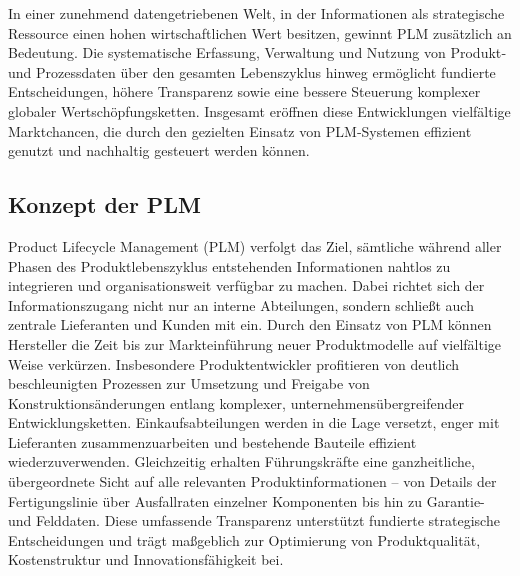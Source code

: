
In einer zunehmend datengetriebenen Welt, in der Informationen als strategische Ressource einen hohen wirtschaftlichen Wert besitzen, gewinnt PLM zusätzlich an Bedeutung. Die systematische Erfassung, Verwaltung und Nutzung von Produkt‑ und Prozessdaten über den gesamten Lebenszyklus hinweg ermöglicht fundierte Entscheidungen, höhere Transparenz sowie eine bessere Steuerung komplexer globaler Wertschöpfungsketten.
Insgesamt eröffnen diese Entwicklungen vielfältige Marktchancen, die durch den gezielten Einsatz von PLM‑Systemen effizient genutzt und nachhaltig gesteuert werden können. \cite{grieves2005product}
\subsection{Konzept der PLM}
Product Lifecycle Management (PLM) verfolgt das Ziel, sämtliche während aller Phasen des Produktlebenszyklus entstehenden Informationen nahtlos zu integrieren und organisationsweit verfügbar zu machen. Dabei richtet sich der Informationszugang nicht nur an interne Abteilungen, sondern schließt auch zentrale Lieferanten und Kunden mit ein.
Durch den Einsatz von PLM können Hersteller die Zeit bis zur Markteinführung neuer Produktmodelle auf vielfältige Weise verkürzen. Insbesondere Produktentwickler profitieren von deutlich beschleunigten Prozessen zur Umsetzung und Freigabe von Konstruktionsänderungen entlang komplexer, unternehmensübergreifender Entwicklungsketten. Einkaufsabteilungen werden in die Lage versetzt, enger mit Lieferanten zusammenzuarbeiten und bestehende Bauteile effizient wiederzuverwenden.
Gleichzeitig erhalten Führungskräfte eine ganzheitliche, übergeordnete Sicht auf alle relevanten Produktinformationen – von Details der Fertigungslinie über Ausfallraten einzelner Komponenten bis hin zu Garantie- und Felddaten. Diese umfassende Transparenz unterstützt fundierte strategische Entscheidungen und trägt maßgeblich zur Optimierung von Produktqualität, Kostenstruktur und Innovationsfähigkeit bei. \cite{sudarsan2005product}
